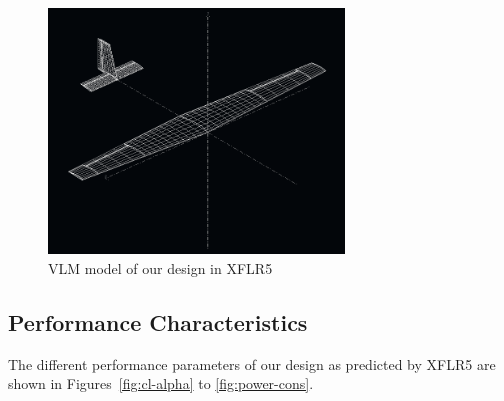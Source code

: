 \documentclass[11pt]{article}
\begin{document}
\begin{figure}[h!]
  \centering
  \includegraphics[width=0.7\textwidth]{Figures/PS3/SkynetV3_XFLR_pic.png}
  \caption{VLM model of our design in XFLR5}\label{fig:vlm-design}
\end{figure}

\subsection{Performance Characteristics}
\label{PerfChar}

The different performance parameters of our design as predicted by XFLR5 are shown in Figures~\ref{fig:cl-alpha} to \ref{fig:power-cons}.
\end{document}

